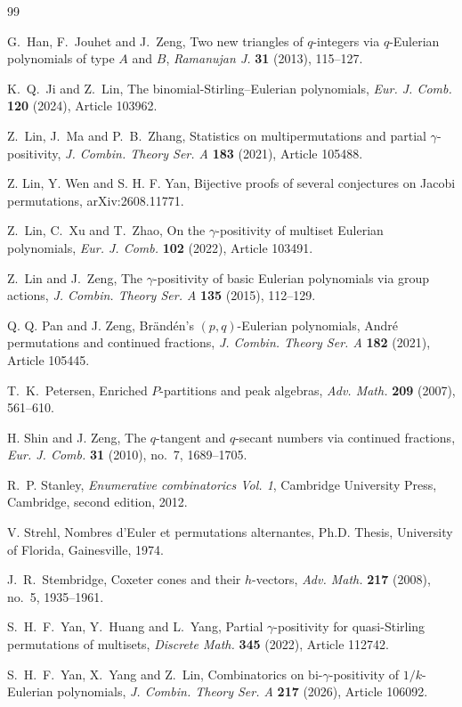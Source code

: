 \documentclass[12pt]{article}
\numberwithin{equation}{section}
\theoremstyle{plain}
\begin{document}
\begin{thebibliography}{99}
	 
		
	G.~Han, F.~Jouhet and J.~Zeng,
	Two new triangles of $q$-integers via $q$-Eulerian polynomials of type $A$ and $B$,
	\emph{Ramanujan J.} \textbf{31} (2013), 115--127.
		 
		 
		 
		 K.~Q.~Ji and Z.~Lin,
		 The binomial-Stirling--Eulerian polynomials,
		 \emph{Eur. J. Comb.} \textbf{120} (2024), Article 103962.
		 
	Z.~Lin, J.~Ma and P.~B.~Zhang,
	Statistics on multipermutations and partial $\gamma$-positivity,
	\emph{J. Combin. Theory Ser. A} \textbf{183} (2021), Article 105488.

Z. Lin, Y. Wen and S. H. F. Yan, Bijective proofs of several conjectures on Jacobi permutations, arXiv:2608.11771.


Z.~Lin, C.~Xu and T.~Zhao,
On the $\gamma$-positivity of multiset Eulerian polynomials,
\emph{Eur. J. Comb.} \textbf{102} (2022), Article 103491.


Z.~Lin and J.~Zeng,
The $\gamma$-positivity of basic Eulerian polynomials via group actions,
\emph{J. Combin. Theory Ser. A} \textbf{135} (2015), 112--129.


Q. Q. Pan and J. Zeng, Brändén's $(p,q)$-Eulerian polynomials, André permutations and continued fractions, \textit{J. Combin. Theory Ser. A} \textbf{182} (2021),  Article 105445.

T.~K.~Petersen,
Enriched $P$-partitions and peak algebras,
\emph{Adv. Math.} \textbf{209} (2007), 561--610.

H. Shin and J. Zeng, The $q$-tangent and $q$-secant numbers via continued fractions, \textit{Eur. J. Comb.} \textbf{31} (2010), no.~7, 1689--1705.

		  R.~P. Stanley, \emph{Enumerative combinatorics Vol. 1}, Cambridge University Press, Cambridge, second edition, 2012.
		 
		 	 V. Strehl, Nombres d'Euler et permutations alternantes, Ph.D. Thesis, University of Florida, Gainesville, 1974.
		 	
		 J.~R.~Stembridge,
		 Coxeter cones and their $h$-vectors,
		 \emph{Adv. Math.} \textbf{217} (2008), no.~5, 1935--1961.
		 
		 
		 S.~H.~F.~Yan, Y.~Huang and L.~Yang,
		 Partial $\gamma$-positivity for quasi-Stirling permutations of multisets,
		 \emph{Discrete Math.} \textbf{345} (2022),  Article 112742. 
		 
		 
		 S.~H.~F.~Yan, X.~Yang and Z.~Lin,
		 Combinatorics on bi-$\gamma$-positivity of $1/k$-Eulerian polynomials,
		 \emph{J. Combin. Theory Ser. A} \textbf{217} (2026), Article 106092.
		 
	\end{thebibliography}
	
\end{document}

